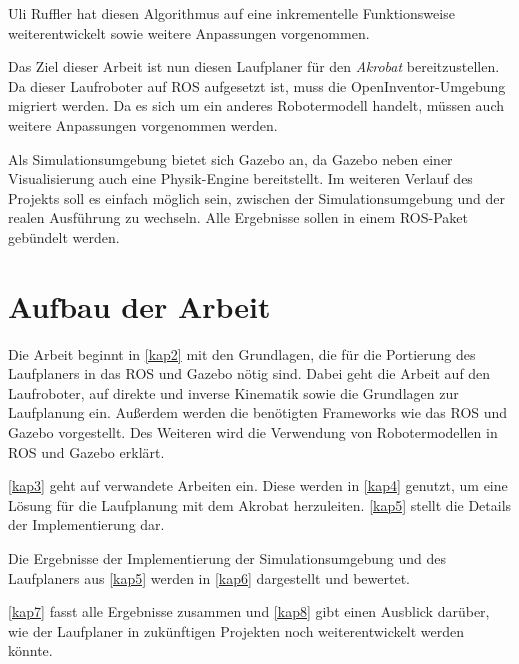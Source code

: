 Uli Ruffler \autocite{ruffler2006} hat diesen Algorithmus auf eine inkrementelle Funktionsweise weiterentwickelt sowie weitere Anpassungen vorgenommen.

Das Ziel dieser Arbeit ist nun diesen Laufplaner für den \emph{Akrobat} bereitzustellen. Da dieser Laufroboter auf \ac{ROS} aufgesetzt ist, muss die OpenInventor-Umgebung migriert werden. Da es sich um ein anderes Robotermodell handelt, müssen auch weitere Anpassungen vorgenommen werden.

Als Simulationsumgebung bietet sich Gazebo an, da Gazebo neben einer Visualisierung auch eine Physik-Engine bereitstellt. Im weiteren Verlauf des Projekts soll es einfach möglich sein, zwischen der Simulationsumgebung und der realen Ausführung zu wechseln. Alle Ergebnisse sollen in einem \ac{ROS}-Paket gebündelt werden.

\section{Aufbau der Arbeit}

Die Arbeit beginnt in \autoref{kap2} mit den Grundlagen, die für die Portierung des Laufplaners in das \ac{ROS} und Gazebo nötig sind. Dabei geht die Arbeit auf den Laufroboter, auf direkte und inverse Kinematik sowie die Grundlagen zur Laufplanung ein. Außerdem werden die benötigten Frameworks wie das \ac{ROS} und Gazebo vorgestellt. Des Weiteren wird die Verwendung von Robotermodellen in \ac{ROS} und Gazebo erklärt.

\autoref{kap3} geht auf verwandete Arbeiten ein. Diese werden in \autoref{kap4} genutzt, um eine Lösung für die Laufplanung mit dem Akrobat herzuleiten. \autoref{kap5} stellt die Details der Implementierung dar.

Die Ergebnisse der Implementierung der Simulationsumgebung und des Laufplaners aus \autoref{kap5} werden in \autoref{kap6} dargestellt und bewertet.

\autoref{kap7} fasst alle Ergebnisse zusammen und \autoref{kap8} gibt einen Ausblick darüber, wie der Laufplaner in zukünftigen Projekten noch weiterentwickelt werden könnte.